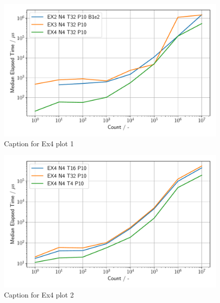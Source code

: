 \begin{figure}[h]
    \begin{center}
        \includegraphics[width=1.0\linewidth]{figures/Ex4_1.pdf}
        \caption{Caption for Ex4 plot 1}
        \label{Ex4_1_p}
    \end{center}
\end{figure}

\begin{figure}[h]
    \begin{center}
        \includegraphics[width=1.0\linewidth]{figures/Ex4_2.pdf}
        \caption{Caption for Ex4 plot 2}
        \label{Ex4_2_p}
    \end{center}
\end{figure}

